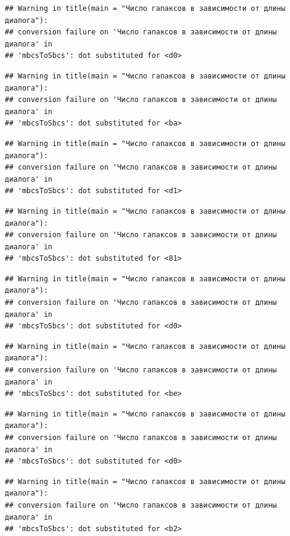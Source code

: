 \documentclass[
]{book}
\theoremstyle{definition}
\theoremstyle{definition}
\theoremstyle{definition}
\theoremstyle{definition}
\theoremstyle{remark}
\begin{document}
\begin{verbatim}
## Warning in title(main = "Число гапаксов в зависимости от длины диалога"):
## conversion failure on 'Число гапаксов в зависимости от длины диалога' in
## 'mbcsToSbcs': dot substituted for <d0>
\end{verbatim}

\begin{verbatim}
## Warning in title(main = "Число гапаксов в зависимости от длины диалога"):
## conversion failure on 'Число гапаксов в зависимости от длины диалога' in
## 'mbcsToSbcs': dot substituted for <ba>
\end{verbatim}

\begin{verbatim}
## Warning in title(main = "Число гапаксов в зависимости от длины диалога"):
## conversion failure on 'Число гапаксов в зависимости от длины диалога' in
## 'mbcsToSbcs': dot substituted for <d1>
\end{verbatim}

\begin{verbatim}
## Warning in title(main = "Число гапаксов в зависимости от длины диалога"):
## conversion failure on 'Число гапаксов в зависимости от длины диалога' in
## 'mbcsToSbcs': dot substituted for <81>
\end{verbatim}

\begin{verbatim}
## Warning in title(main = "Число гапаксов в зависимости от длины диалога"):
## conversion failure on 'Число гапаксов в зависимости от длины диалога' in
## 'mbcsToSbcs': dot substituted for <d0>
\end{verbatim}

\begin{verbatim}
## Warning in title(main = "Число гапаксов в зависимости от длины диалога"):
## conversion failure on 'Число гапаксов в зависимости от длины диалога' in
## 'mbcsToSbcs': dot substituted for <be>
\end{verbatim}

\begin{verbatim}
## Warning in title(main = "Число гапаксов в зависимости от длины диалога"):
## conversion failure on 'Число гапаксов в зависимости от длины диалога' in
## 'mbcsToSbcs': dot substituted for <d0>
\end{verbatim}

\begin{verbatim}
## Warning in title(main = "Число гапаксов в зависимости от длины диалога"):
## conversion failure on 'Число гапаксов в зависимости от длины диалога' in
## 'mbcsToSbcs': dot substituted for <b2>
\end{verbatim}
\end{document}
